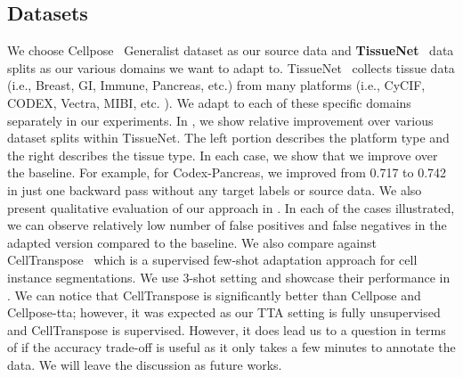\subsection{Datasets}
We choose Cellpose~\cite{stringer2021cellpose} Generalist dataset as our source data and \textbf{TissueNet}~\cite{TissueNet} data splits as our various domains we want to adapt to. TissueNet~\cite{TissueNet} collects tissue data (i.e., Breast, GI, Immune, Pancreas, etc.) from many platforms (i.e., CyCIF, CODEX, Vectra, MIBI, etc. ). We adapt to each of these specific domains separately in our experiments. In , we show relative improvement over various dataset splits within TissueNet. The left portion describes the platform type and the right describes the tissue type. In each case, we show that we improve over the baseline. For example, for Codex-Pancreas, we improved from 0.717 to 0.742 in just one backward pass without any target labels or source data. We also present qualitative evaluation of our approach in . In each of the cases illustrated, we can observe relatively low number of false positives and false negatives in the adapted version compared to the baseline. We also compare against CellTranspose~\cite{keaton2023celltranspose} which is a supervised few-shot adaptation approach for cell instance segmentations. We use 3-shot setting and showcase their performance in  . We can notice that CellTranspose is significantly better than Cellpose and Cellpose-tta; however, it was expected as our TTA setting is fully unsupervised and CellTranspose is supervised. However, it does lead us to a question in terms of if the accuracy trade-off is useful as it only takes a few minutes to annotate the data. We will leave the discussion as future works. 
